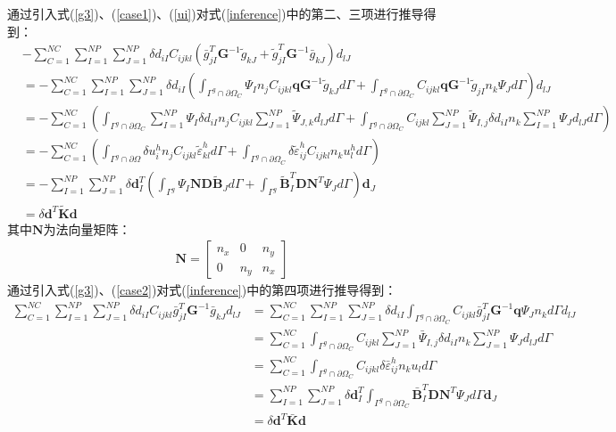 通过引入式(\ref{g3})、(\ref{case1})、(\ref{ui})对式(\ref{inference})中的第二、三项进行推导得到：
\begin{equation}
\begin{split}
    &-\sum_{C=1}^{N\!C}\sum_{I=1}^{N\!P}\sum_{J=1}^{N\!P}\delta d_{iI}C_{ijkl}(\bar{g}_{jI}^T\pmb{G}^{-1}\tilde{g}_{kJ}+\tilde{g}_{jI}^T\pmb{G}^{-1}\bar{g}_{kJ})d_{lJ}\\
    &=-\sum_{C=1}^{N\!C}\sum_{I=1}^{N\!P}\sum_{J=1}^{N\!P}\delta d_{iI}(\int_{\Gamma^g\cap\partial\Omega_C}\Psi_In_jC_{ijkl}\pmb{q}\pmb{G}^{-1}\tilde{g}_{kJ}d\Gamma+\int_{\Gamma^g\cap\partial\Omega_C}C_{ijkl}\pmb{q}\pmb{G}^{-1}\tilde{g}_{jI}n_k\Psi_Jd\Gamma)d_{lJ}\\
    &=-\sum_{C=1}^{N\!C}(\int_{\Gamma^g\cap\partial\Omega_C}\sum_{I=1}^{N\!P}\Psi_I\delta d_{iI}n_jC_{ijkl}\sum_{J=1}^{N\!P}\tilde{\Psi}_{J,k}d_{lJ}d\Gamma+\int_{\Gamma^g\cap\partial\Omega_C}C_{ijkl}\sum_{J=1}^{N\!P}\tilde{\Psi}_{I,j}\delta d_{iI}n_k\sum_{I=1}^{N\!P}\Psi_Jd_{lJ}d\Gamma)\\
    &=-\sum_{C=1}^{N\!C}(\int_{\Gamma^g\cap\partial\Omega}\delta u_i^hn_jC_{ijkl}\tilde{\varepsilon}_{kl}^hd\Gamma+\int_{\Gamma^g\cap\partial\Omega_C}\delta\tilde{\varepsilon}_{ij}^hC_{ijkl}n_ku^h_ld\Gamma)\\
    &=-\sum_{I=1}^{N\!P}\sum_{J=1}^{N\!P}\delta\pmb{d}_I^T(\int_{\Gamma^g}\Psi_I\pmb{N}\pmb{D}\tilde{\pmb{B}}_Jd\Gamma+\int_{\Gamma^g}\tilde{\pmb{B}}_I^T\pmb{D}\pmb{N}^T\Psi_Jd\Gamma)\pmb d_J\\
    &=\delta\pmb{d}^T\tilde{\pmb{K}}\pmb{d}
\end{split}
\end{equation}
其中$\pmb{N}$为法向量矩阵：
\begin{equation}
\begin{split}
    \pmb{N}=\left[\begin{matrix}n_x&0&n_y\\0&n_y&n_x
    \end{matrix}\right] 
\end{split}
\end{equation}
通过引入式(\ref{g3})、(\ref{case2})对式(\ref{inference})中的第四项进行推导得到：
\begin{equation}
\begin{split}
    \sum_{C=1}^{N\!C}\sum_{I=1}^{N\!P}\sum_{J=1}^{N\!P}\delta d_{iI}C_{ijkl}\bar{g}^T_{jI}\pmb{G}^{-1}\bar{g}_{kJ}d_{lJ}
    &=\sum_{C=1}^{N\!C}\sum_{I=1}^{N\!P}\sum_{J=1}^{N\!P}\delta d_{iI}\int_{\Gamma^g\cap\partial\Omega_C}C_{ijkl}\bar{g}_{jI}^T\pmb{G}^{-1}\pmb{q}\Psi_Jn_kd\Gamma d_{lJ}\\
    &=\sum_{C=1}^{N\!C}\int_{\Gamma^g\cap\partial\Omega_C}C_{ijkl}\sum_{J=1}^{N\!P}\bar{\Psi}_{I,j}\delta d_{iI}n_k\sum_{J=1}^{N\!P}\Psi_{J}d_{lJ}d\Gamma\\
    &=\sum_{C=1}^{N\!C}\int_{\Gamma^g\cap\partial\Omega_C}C_{ijkl}\delta\bar{\varepsilon}_{ij}^hn_ku_ld\Gamma\\
    &=\sum_{I=1}^{N\!P}\sum_{J=1}^{N\!P}\delta\pmb{d}_I^T\int_{\Gamma^g\cap\partial\Omega_C}\bar{\pmb{B}}_I^T\pmb{D}\pmb{N}^T\Psi_Jd\Gamma\pmb{d}_J\\
    &=\delta\pmb{d}^T\bar{\pmb{K}}\pmb{d}
\end{split}
\end{equation}
